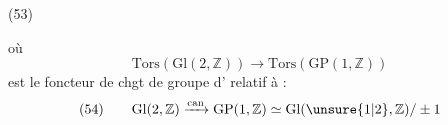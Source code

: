 \begin{samepage}
(53)\quad
{}
\end{samepage}

où 
\[
\mathrm{Tors}(\mathrm{Gl}(2,\mathbb Z))\longrightarrow
\mathrm{Tors}(\mathrm{GP}(1,\mathbb Z))
\]
est le foncteur de chgt de groupe d' relatif à :
\[
(54)\qquad
\mathrm{Gl}(2,\mathbb Z)\xrightarrow{\mathrm{can}}
\mathrm{GP}(1,\mathbb Z)\simeq
\mathrm{Gl}(\unsure{1|2},\mathbb Z)/\pm1
\]

